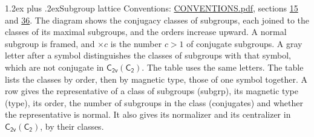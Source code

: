 \documentclass[10pt,a4paper]{article}
\makeatletter
\renewcommand\section{\@startsection{section}{1}{\z@}{-3ex plus -1ex minus -.2ex}%
  {1.2ex plus .2ex}{\normalfont\large\sffamily\bfseries\color{parttitle}}}
\numberwithin{equation}{section}
\newcommand{\grp}[1]{\mathsf{#1}}
\newcommand{\clsletter}[1]{\,{\scriptsize\color{black!55}#1}}
\makeatother
\begin{document}
\section{Subgroup lattice}\label{s:subgroups}
Conventions: \href{../../CONVENTIONS.pdf}{CONVENTIONS.pdf}, sections \href{../../../rotation/CONVENTIONS.pdf\#conv.15}{15} and \href{../../CONVENTIONS.pdf\#conv.36}{36}.
The diagram shows the conjugacy classes of subgroups, each joined to the classes of its maximal subgroups, and the orders increase upward. \label{n:index.conjugates.c}A normal subgroup is framed, and ${\times}c$ is the number $c > 1$ of conjugate subgroups. \label{n:mark.letter}A gray letter after a symbol distinguishes the classes of subgroups with that symbol, which are not conjugate in $\grp{C_{2v}}(\grp{C_{2}})$. The table uses the same letters. The table lists the classes by order, then by magnetic type, those of one symbol together. \label{n:head.subgroup}\label{n:head.magnetic.type}\label{n:head.order}\label{n:head.conjugates}\label{n:head.normal}A row gives the representative of a class of subgroups (subgrp), its magnetic type (type), its order, the number of subgroups in the class (conjugates) and whether the representative is normal. \label{n:head.normalizer}\label{n:head.centralizer}It also gives its normalizer and its centralizer in $\grp{C_{2v}}(\grp{C_{2}})$, by their classes. 
\begin{center}
\end{center}
\end{document}
